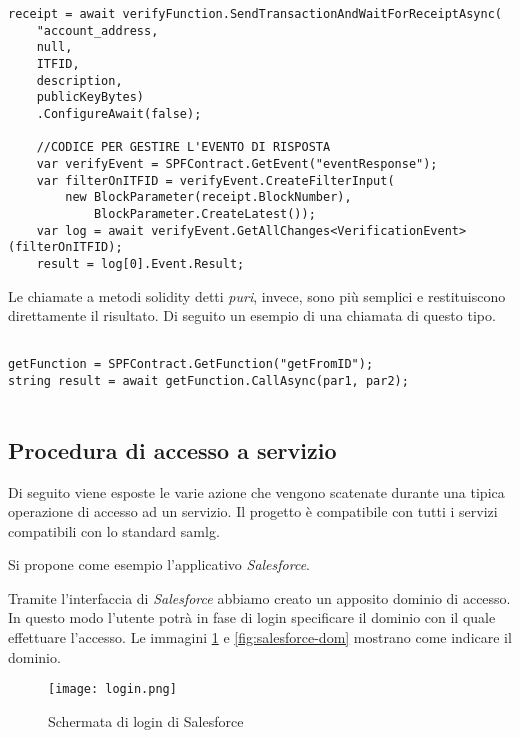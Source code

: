 \begin{lstlisting}[caption={Creazione del contratto},label={lst:transax},language={[Sharp]C}]
receipt = await verifyFunction.SendTransactionAndWaitForReceiptAsync(
    "account_address,
    null, 
    ITFID,
    description, 
    publicKeyBytes)
    .ConfigureAwait(false);          

    //CODICE PER GESTIRE L'EVENTO DI RISPOSTA
    var verifyEvent = SPFContract.GetEvent("eventResponse");
    var filterOnITFID = verifyEvent.CreateFilterInput(
        new BlockParameter(receipt.BlockNumber),
            BlockParameter.CreateLatest());
    var log = await verifyEvent.GetAllChanges<VerificationEvent>(filterOnITFID);
    result = log[0].Event.Result;
\end{lstlisting}


Le chiamate a metodi solidity detti \emph{puri}, invece, sono più semplici e restituiscono direttamente il risultato.
Di seguito un esempio di una chiamata di questo tipo.

\begin{lstlisting}[caption={Esempio di chiamata a metodo puro},label={lst:call_ex},language={[Sharp]C}]

getFunction = SPFContract.GetFunction("getFromID");
string result = await getFunction.CallAsync(par1, par2);
    
\end{lstlisting}


\subsection{Procedura di accesso a servizio}
Di seguito viene esposte le varie azione che vengono scatenate durante una tipica operazione di accesso ad un servizio. Il progetto è compatibile con tutti i servizi compatibili con lo standard \gls{samlg}.

\noindent Si propone come esempio l'applicativo \emph{Salesforce}.

Tramite l'interfaccia di \emph{Salesforce} abbiamo creato un apposito dominio di accesso. In questo modo l'utente potrà in fase di login specificare il dominio con il quale effettuare l'accesso.
Le immagini \ref{fig:salesforce-login} e \ref{fig:salesforce-dom} mostrano come indicare il dominio.

\begin{figure}[!h]
    
    \centering
    \texttt{[image: login.png]} 
    \caption{Schermata di login di Salesforce}
    \label{fig:salesforce-login} 
\end{figure}

